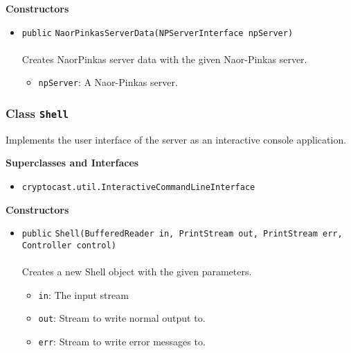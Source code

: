\textbf{\sffamily Constructors}
\begin{itemize}
\item \lstinline|public| \lstinline|NaorPinkasServerData|\lstinline|(NPServerInterface npServer)|\\ \\[-0.6em]
Creates NaorPinkas server data with the given Naor-Pinkas server.
\begin{itemize}
\item \lstinline|npServer|: A Naor-Pinkas server.
\end{itemize}



\end{itemize}


\subsubsection{Class \lstinline|Shell|}
Implements the user interface of the server as an interactive console application. \\
\noindent\begin{minipage}[t]{5cm}
\vspace{0.3em}
\hspace*{2em}
\vspace{0.3em}
\end{minipage}



\textbf{\sffamily Superclasses and Interfaces}
\begin{itemize}
\item \lstinline|cryptocast.util.InteractiveCommandLineInterface|
\end{itemize}


\textbf{\sffamily Constructors}
\begin{itemize}
\item \lstinline|public| \lstinline|Shell|\lstinline|(BufferedReader in, PrintStream out, PrintStream err, Controller control)|\\ \\[-0.6em]
Creates a new Shell object with the given parameters.
\begin{itemize}
\item \lstinline|in|: The input stream
\item \lstinline|out|: Stream to write normal output to.
\item \lstinline|err|: Stream to write error messages to.
\end{itemize}



\end{itemize}


